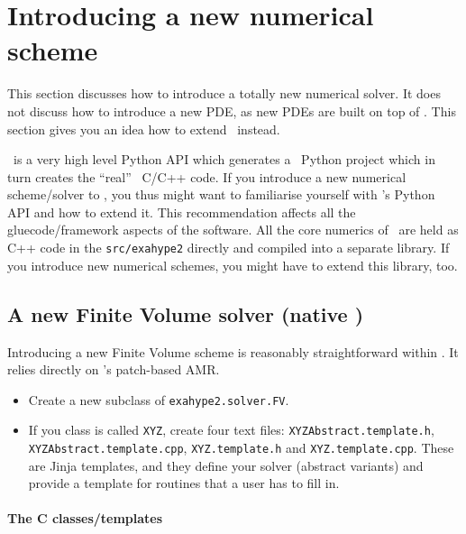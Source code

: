 \section{Introducing a new numerical scheme}

This section discusses how to introduce a totally new numerical solver. 
It does not discuss how to introduce a new PDE, as new PDEs are built on top of
\ExaHyPE.
This section gives you an idea how to extend \ExaHyPE\ instead.

\begin{remark}
  \ExaHyPE\ is a very high level Python API which generates a \Peano\
   Python project which in turn creates the ``real'' \Peano\ C/C++ code. If you
   introduce a new numerical scheme/solver to \ExaHyPE, you thus might want to
   familiarise yourself with \Peano's Python API and how to extend it. This
   recommendation affects all the gluecode/framework aspects of the software.
   All the core numerics of \ExaHyPE\ are held as C++ code in the
   \texttt{src/exahype2} directly and compiled into a separate library. If you
   introduce new numerical schemes, you might have to extend this library, too.
\end{remark}



\subsection{A new Finite Volume solver (native \ExaHyPE)}

Introducing a new Finite Volume scheme is reasonably straightforward within
\ExaHyPE.
It relies directly on \Peano's patch-based AMR.


\begin{itemize}
  \item Create a new subclass of \texttt{exahype2.solver.FV}.
  \item If you class is called \texttt{XYZ}, create four text files:
  \texttt{XYZAbstract.template.h}, \linebreak \texttt{XYZAbstract.template.cpp},
  \texttt{XYZ.template.h} and \texttt{XYZ.template.cpp}. These are Jinja
  templates, and they define your solver (abstract variants) and provide a
  template for routines that a user has to fill in.
\end{itemize}


\paragraph{The C classes/templates}

